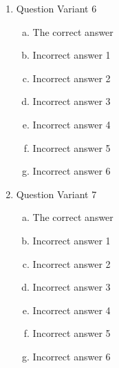 \documentclass{article}
\begin{document}
\begin{enumerate}
\item Question Variant 6
  \begin{enumerate}[a)]
  \item The correct answer
  \item Incorrect answer 1
  \item Incorrect answer 2
  \item Incorrect answer 3
  \item Incorrect answer 4
  \item Incorrect answer 5
  \item Incorrect answer 6
  \end{enumerate}

\item Question Variant 7
  \begin{enumerate}[a)]
  \item The correct answer
  \item Incorrect answer 1
  \item Incorrect answer 2
  \item Incorrect answer 3
  \item Incorrect answer 4
  \item Incorrect answer 5
  \item Incorrect answer 6
  \end{enumerate}
\end{enumerate}
\end{document}
